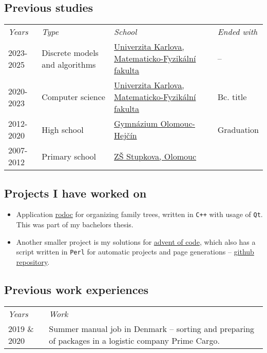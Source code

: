 \documentclass{article}
\begin{document}
\subsection*{Previous studies}

\begin{table}[!ht]\centering
	\begin{tabular}{p{20mm} p{50mm} p{80mm} p{20mm}}
		\textit{Years} & \textit{Type} & \textit{School} & \textit{Ended with} \\
		2023-2025\tablefootnote{Expected end of studies.} & Discrete models and algorithms & \href{https://www.mff.cuni.cz/}{Univerzita Karlova, Matematicko-Fyzikální fakulta} & -- \\
		2020-2023 & Computer science & \href{https://www.mff.cuni.cz/}{Univerzita Karlova, Matematicko-Fyzikální fakulta} & Bc. title \\
		2012-2020 & High school & \href{https://www.gytool.cz/}{Gymnázium Olomouc-Hejčín} & Graduation \\
		2007-2012 & Primary school & \href{https://zsstupkova.cz/}{ZŠ Stupkova, Olomouc} & \\
	\end{tabular}
\end{table}

\subsection*{Projects I have worked on}

\begin{itemize}
	\item Application \href{https://rodoc-app.github.io/}{rodoc} for organizing family trees, written in \texttt{C++} with usage of \texttt{Qt}. This was part of my bachelors thesis.
	\item Another smaller project is my solutions for \href{https://adventofcode.com/}{advent of code}, which also has a script written in \texttt{Perl} for automatic projects and page generations -- \href{https://github.com/metury/advent-of-code}{github repository}.
\end{itemize}

\subsection*{Previous work experiences}

\begin{table}[!ht]\centering
	\begin{tabular}{p{20mm} p{150mm}}
		\textit{Years} & \textit{Work} \\
		2019 \& 2020 & Summer manual job in Denmark -- sorting and preparing of packages in a logistic company Prime Cargo.
	\end{tabular}
\end{table}
\end{document}

